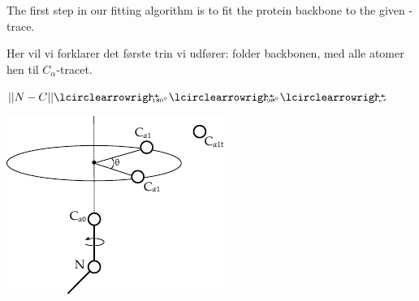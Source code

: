 The first step in our fitting algorithm is to fit the protein backbone to the given \Ca-trace.


Her vil vi forklarer det første trin vi udfører: folder backbonen, med
alle atomer hen til $C_\alpha$-tracet.

$||N - C|| \rotateAround{180^\circ} \rotateAround{90^\circ} \rotateAround{v}$


\begin{center}
	\includegraphics[width=0.85\columnwidth]{figures/ccd_angles}
	\label{fig:ccd_angles}
\end{center}


